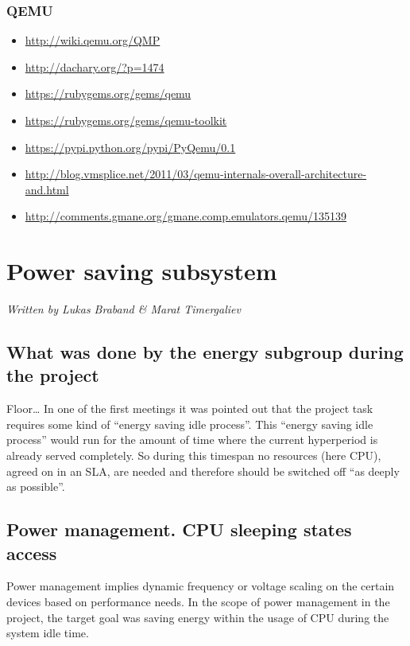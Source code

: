 \documentclass[]{report}
\begin{document}
\subsection{QEMU}\label{qemu}

\begin{itemize}
\itemsep1pt\parskip0pt
\item
  \url{http://wiki.qemu.org/QMP}
\item
  \url{http://dachary.org/?p=1474}
\item
  \url{https://rubygems.org/gems/qemu}
\item
  \url{https://rubygems.org/gems/qemu-toolkit}
\item
  \url{https://pypi.python.org/pypi/PyQemu/0.1}
\item
  \url{http://blog.vmsplice.net/2011/03/qemu-internals-overall-architecture-and.html}
\item
  \url{http://comments.gmane.org/gmane.comp.emulators.qemu/135139}
\end{itemize}

\chapter{Power saving subsystem}\label{power-saving-subsystem}

\emph{Written by Lukas Braband \& Marat Timergaliev}

\section{What was done by the energy subgroup during the
project}\label{what-was-done-by-the-energy-subgroup-during-the-project}

Floor\ldots{} In one of the first meetings it was pointed out that the
project task requires some kind of ``energy saving idle process''. This
``energy saving idle process'' would run for the amount of time where
the current hyperperiod is already served completely. So during this
timespan no resources (here CPU), agreed on in an SLA, are needed and
therefore should be switched off ``as deeply as possible''.

\section{Power management. CPU sleeping states
access}\label{power-management.-cpu-sleeping-states-access}

Power management implies dynamic frequency or voltage scaling on the
certain devices based on performance needs. In the scope of power
management in the project, the target goal was saving energy within the
usage of CPU during the system idle time.
\end{document}
